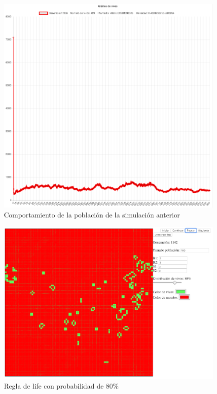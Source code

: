 	\begin{figure}[H]
		\begin{center}
			\includegraphics[scale=.24]{GOL/img/life70-2.png}
			\caption{Comportamiento de la población de la simulación anterior}
			\label{fig:gol5}
		\end{center}
	\end{figure}

	\begin{figure}[H]
		\begin{center}
			\includegraphics[scale=.3]{GOL/img/life80-1.png}
			\caption{Regla de life con probabilidad de 80\%}
			\label{fig:gol5}
		\end{center}
	\end{figure}

